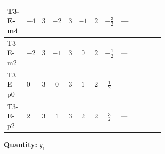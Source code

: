\documentclass[8pt]{article}
\begin{document}
\begin{landscape}
\begin{longtable}{@{}llcccccc >{\raggedright\arraybackslash}p{0.21\linewidth} >{\raggedright\arraybackslash}p{0.21\linewidth} >{\raggedright\arraybackslash}p{0.21\linewidth}@{}}
\midrule
T3-E-m4 & $-4$ & $3$ & $-2$ & $3$ & $-1$ & $2$ & $-\frac{3}{2}$ & --- & \scriptsize\adjustbox{max width=\linewidth}{$\begin{gathered} -\frac{9}{2} {g_2}^2 \left({y_1}\right)_{ij}\end{gathered}$} & \scriptsize\adjustbox{max width=\linewidth}{$\begin{gathered} -\frac{15}{2} {g_1}^2 \left({y_1}\right)_{ij}\end{gathered}$} \\
\midrule
T3-E-m2 & $-2$ & $3$ & $-1$ & $3$ & $0$ & $2$ & $-\frac{1}{2}$ & --- & \scriptsize\adjustbox{max width=\linewidth}{$\begin{gathered} -\frac{9}{2} {g_2}^2 \left({y_1}\right)_{ij}\end{gathered}$} & \scriptsize\adjustbox{max width=\linewidth}{$\begin{gathered} -\frac{3}{2} {g_1}^2 \left({y_1}\right)_{ij}\end{gathered}$} \\
\midrule
T3-E-p0 & $0$ & $3$ & $0$ & $3$ & $1$ & $2$ & $\frac{1}{2}$ & --- & \scriptsize\adjustbox{max width=\linewidth}{$\begin{gathered} -\frac{9}{2} {g_2}^2 \left({y_1}\right)_{ij}\end{gathered}$} & \scriptsize\adjustbox{max width=\linewidth}{$\begin{gathered} -\frac{3}{2} {g_1}^2 \left({y_1}\right)_{ij}\end{gathered}$} \\
\midrule
T3-E-p2 & $2$ & $3$ & $1$ & $3$ & $2$ & $2$ & $\frac{3}{2}$ & --- & \scriptsize\adjustbox{max width=\linewidth}{$\begin{gathered} -\frac{9}{2} {g_2}^2 \left({y_1}\right)_{ij}\end{gathered}$} & \scriptsize\adjustbox{max width=\linewidth}{$\begin{gathered} -\frac{15}{2} {g_1}^2 \left({y_1}\right)_{ij}\end{gathered}$} \\
\midrule
\bottomrule
\end{longtable}
\clearpage
\noindent\textbf{Quantity: }$y_1$\par\smallskip

\end{landscape}
\end{document}
